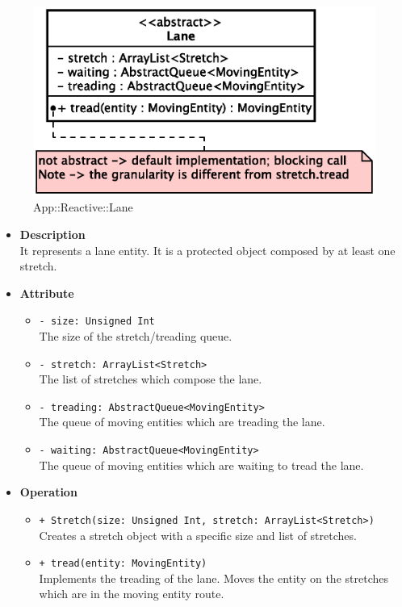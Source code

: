 \begin{figure}[h]
\centering
\includegraphics[scale=0.6,keepaspectratio]{images/solution/lane.eps}
\caption{App::Reactive::Lane}
\label{fig:sd-app-lane}
\end{figure}
\FloatBarrier
\begin{itemize}
  \item \textbf{Description} \\
    It represents a lane entity. It is a protected object composed by at least
one stretch.
  \item \textbf{Attribute}
  \begin{itemize}
    \item \texttt{- size: Unsigned Int} \\
The size of the stretch/treading queue.
    \item \texttt{- stretch: ArrayList<Stretch>} \\
The list of stretches which compose the lane.
    \item \texttt{- treading: AbstractQueue<MovingEntity>} \\
The queue of moving entities which are treading the lane.
    \item \texttt{- waiting: AbstractQueue<MovingEntity>} \\
The queue of moving entities which are waiting to tread the lane. 
  \end{itemize}
  \item \textbf{Operation}
  \begin{itemize} 
    \item \texttt{+ Stretch(size: Unsigned Int, stretch: ArrayList<Stretch>)} \\
Creates a stretch object with a specific size and list of stretches.
    \item \texttt{+ tread(entity: MovingEntity)} \\
Implements the treading of the lane. Moves the entity on the stretches which are 
in the moving entity route.
  \end{itemize}
\end{itemize}
